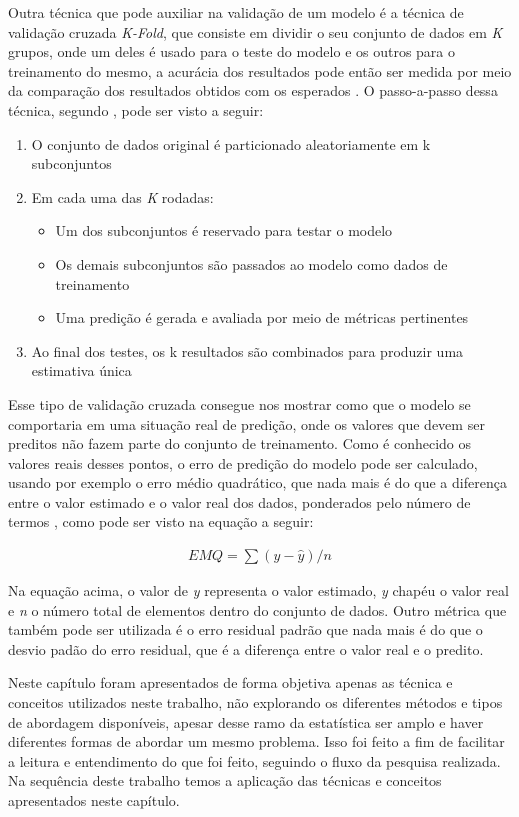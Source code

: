 Outra técnica que pode auxiliar na validação de um modelo é a técnica de
validação cruzada \textit{K-Fold}, que consiste em dividir o seu conjunto de
dados em \textit{K} grupos, onde um deles é usado para o teste do modelo e
os outros para o treinamento do mesmo, a acurácia dos resultados pode então ser
medida por meio da comparação dos resultados obtidos com os esperados
\cite{tassia:2011}. O passo-a-passo dessa técnica, segundo
, pode ser visto a seguir:

\begin{enumerate}
  \item O conjunto de dados original é particionado aleatoriamente em k
    subconjuntos
  \item Em cada uma das \textit{K} rodadas:
    \begin{itemize}
      \item Um dos subconjuntos é reservado para testar o modelo
      \item Os demais subconjuntos são passados ao modelo como dados de treinamento
      \item Uma predição é gerada e avaliada por meio de métricas pertinentes
    \end{itemize}
  \item Ao final dos testes, os k resultados são combinados para produzir uma
    estimativa única
\end{enumerate}

Esse tipo de validação cruzada consegue nos mostrar como que o modelo se
comportaria em uma situação real de predição, onde os valores que devem ser
preditos não fazem parte do conjunto de treinamento. Como é conhecido os valores
reais desses pontos, o erro de predição do modelo pode ser calculado, usando por
exemplo o erro médio quadrático, que nada mais é do que a diferença entre o
valor estimado e o valor real dos dados, ponderados pelo número de termos
\cite{caetano:2012}, como pode ser visto na equação a seguir:

\begin{align*}
  EMQ = \sum (y - \hat{y}) / n
\end{align*}

Na equação acima, o valor de \textit{y} representa o valor estimado,
\textit{y} chapéu o valor real e \textit{n} o número total de elementos dentro do
conjunto de dados. Outro métrica que também pode ser utilizada é o erro residual
padrão que nada mais é do que o desvio padão do erro residual, que é a diferença
entre o valor real e o predito.



Neste capítulo foram apresentados de forma objetiva apenas as técnica e
conceitos utilizados neste trabalho, não explorando os diferentes métodos e tipos de
abordagem disponíveis, apesar desse ramo da estatística ser amplo e haver diferentes formas
de abordar um mesmo problema. Isso foi feito a fim de facilitar a leitura e
entendimento do que foi feito, seguindo o fluxo da pesquisa realizada. Na
sequência deste trabalho temos a aplicação das técnicas e conceitos apresentados
neste capítulo.
